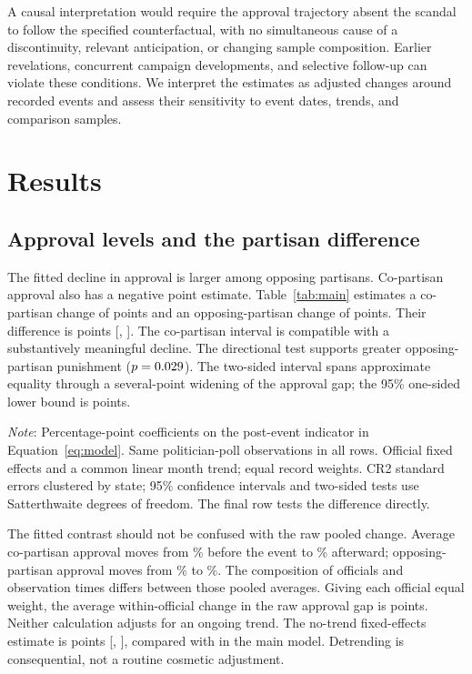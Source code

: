 \documentclass[11pt]{article}
\newcommand{\TableStyle}{\small\setlength{\tabcolsep}{5pt}\renewcommand{\arraystretch}{1.12}}
\begin{document}
A causal interpretation would require the approval trajectory absent the scandal to follow the specified counterfactual, with no simultaneous cause of a discontinuity, relevant anticipation, or changing sample composition. Earlier revelations, concurrent campaign developments, and selective follow-up can violate these conditions. We interpret the estimates as adjusted changes around recorded events and assess their sensitivity to event dates, trends, and comparison samples.

\section{Results}

\subsection{Approval levels and the partisan difference}

The fitted decline in approval is larger among opposing partisans. Co-partisan approval also has a negative point estimate. Table~\ref{tab:main} estimates a co-partisan change of \InEstimate{} points and an opposing-partisan change of \OutEstimate{} points. Their difference is \GapEstimate{} points [\GapLower, \GapUpper]. The co-partisan interval is compatible with a substantively meaningful decline. The directional test supports greater opposing-partisan punishment ($p=0.029$). The two-sided interval spans approximate equality through a several-point widening of the approval gap; the 95\% one-sided lower bound is \InteractionDirectionalLower{} points.

\begin{table}[htbp]
\centering\TableStyle
\caption{Approval changes around the first cataloged scandal.}
\label{tab:main}

\begin{minipage}{\linewidth}\footnotesize
\emph{Note}: Percentage-point coefficients on the post-event indicator in Equation~\ref{eq:model}. Same \CountMainRows{} politician-poll observations in all rows. Official fixed effects and a common linear month trend; equal record weights. CR2 standard errors clustered by state; 95\% confidence intervals and two-sided tests use Satterthwaite degrees of freedom. The final row tests the difference directly.
\end{minipage}
\end{table}

The fitted contrast should not be confused with the raw pooled change. Average co-partisan approval moves from \CountMainPreIn\% before the event to \CountMainPostIn\% afterward; opposing-partisan approval moves from \CountMainPreOut\% to \CountMainPostOut\%. The composition of officials and observation times differs between those pooled averages. Giving each official equal weight, the average within-official change in the raw approval gap is \EqualEventChange{} points. Neither calculation adjusts for an ongoing trend. The no-trend fixed-effects estimate is \NoTrendEstimate{} points [\NoTrendLower, \NoTrendUpper], compared with \GapEstimate{} in the main model. Detrending is consequential, not a routine cosmetic adjustment.
\end{document}
